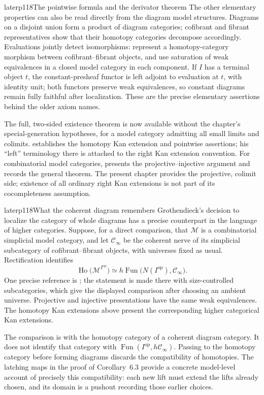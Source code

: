 \begin{dcomment}{later}{p118}{The pointwise formula and the derivator theorem}
The other elementary properties can also be read directly from the diagram model structures. Diagrams on a disjoint union form a product of diagram categories; cofibrant and fibrant representatives show that their homotopy categories decompose accordingly. Evaluations jointly detect isomorphisms: represent a homotopy-category morphism between cofibrant--fibrant objects, and use saturation of weak equivalences in a closed model category in each component. If $I$ has a terminal object $t$, the constant-presheaf functor is left adjoint to evaluation at $t$, with identity unit; both functors preserve weak equivalences, so constant diagrams remain fully faithful after localization. These are the precise elementary assertions behind the older axiom names.

The full, two-sided existence theorem is now available without the chapter's special-generation hypotheses, for a model category admitting all small limits and colimits. \citet[Theorem~6.11 and its dual]{Cisinski2003} establishes the homotopy Kan extension and pointwise assertions; his ``left'' terminology there is attached to the right Kan extension convention. For combinatorial model categories, \citet[Theorem~1.28, Proposition~1.30, and Theorem~1.32]{Groth2013} presents the projective--injective argument and records the general theorem. The present chapter provides the projective, colimit side; existence of all ordinary right Kan extensions is not part of its cocompleteness assumption.
\end{dcomment}

\begin{dcomment}{later}{p118}{What the coherent diagram remembers}
Grothendieck's decision to localize the category of whole diagrams has a precise counterpart in the language of higher categories. Suppose, for a direct comparison, that $\mathcal M$ is a combinatorial simplicial model category, and let $\mathcal C_\infty$ be the coherent nerve of its simplicial subcategory of cofibrant--fibrant objects, with universes fixed as usual. Rectification identifies
\[
 \operatorname{Ho}\bigl(\mathcal M^{I^{\mathrm{op}}}\bigr)
 \simeq h\operatorname{Fun}\bigl(N(I^{\mathrm{op}}),\mathcal C_\infty\bigr).
\]
One precise reference is \citet[Proposition~4.2.4.4, Remark~4.2.4.5, and Corollary~4.2.4.8]{Lurie2009HTT}; the statement is made there with size-controlled subcategories, which give the displayed comparison after choosing an ambient universe. Projective and injective presentations have the same weak equivalences. The homotopy Kan extensions above present the corresponding higher categorical Kan extensions.

The comparison is with the homotopy category of a coherent diagram category. It does not identify that category with $\operatorname{Fun}(I^{\mathrm{op}},h\mathcal C_\infty)$. Passing to the homotopy category before forming diagrams discards the compatibility of homotopies. The latching maps in the proof of Corollary~6.3 provide a concrete model-level account of precisely this compatibility: each new lift must extend the lifts already chosen, and its domain is a pushout recording those earlier choices.
\end{dcomment}

